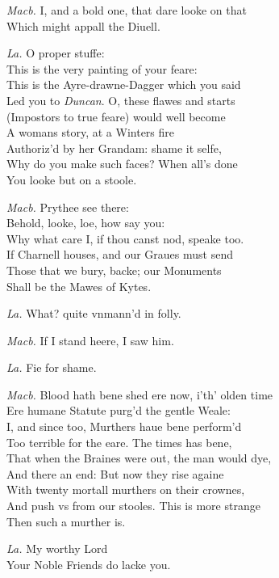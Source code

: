 \documentclass[12pt]{sides}
\newcommand{\dia}[1]{\hskip 15pt\textit{#1}\hskip 6pt}
\begin{document}
\begin{multicols}{2}
            \dia{Macb.} I, and a bold one, that dare looke on that \\ Which might appall the Diuell.

            \dia{La.} O proper stuffe: \\ This is the very painting of your feare: \\ This is the Ayre-drawne-Dagger which you said \\ Led you to \textit{Duncan}. O, these flawes and starts \\ (Impostors to true feare) would well become \\ A womans story, at a Winters fire \\ Authoriz'd by her Grandam: shame it selfe, \\ Why do you make such faces? When all's done \\ You looke but on a stoole.

            \dia{Macb.} Prythee see there: \\ Behold, looke, loe, how say you: \\ Why what care I, if thou canst nod, speake too. \\ If Charnell houses, and our Graues must send \\ Those that we bury, backe; our Monuments \\ Shall be the Mawes of Kytes.

            \dia{La.} What? quite vnmann'd in folly.

            \dia{Macb.} If I stand heere, I saw him.

            \dia{La.} Fie for shame.

            \dia{Macb.} Blood hath bene shed ere now, i'th' olden time \\ Ere humane Statute purg'd the gentle Weale: \\ I, and since too, Murthers haue bene perform'd \\ Too terrible for the eare. The times has bene, \\ That when the Braines were out, the man would dye, \\ And there an end: But now they rise againe \\ With twenty mortall murthers on their crownes, \\ And push vs from our stooles. This is more strange \\ Then such a murther is.

            \dia{La.} My worthy Lord \\ Your Noble Friends do lacke you.


\end{multicols}
\end{document}
